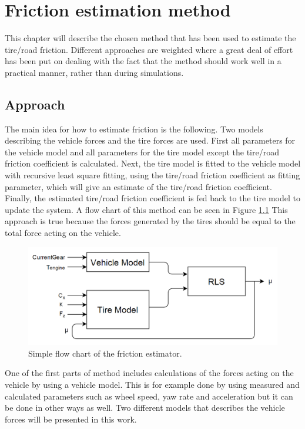 \chapter{Friction estimation method}

This chapter will describe the chosen method that has been used to estimate the tire/road friction. Different approaches are weighted where a great deal of effort has been put on dealing with the fact that the method should work well in a practical manner, rather than during simulations.

\section{Approach}
The main idea for how to estimate friction is the following. Two models describing the vehicle forces and the tire forces are used. First all parameters for the vehicle model and all parameters for the tire model except the tire/road friction coefficient is calculated. Next, the tire model is fitted to the vehicle model with recursive least square fitting, using the tire/road friction coefficient as fitting parameter, which will give an estimate of the tire/road friction coefficient. Finally, the estimated tire/road friction coefficient is fed back to the tire model to update the system. A flow chart of this method can be seen in Figure \ref{friction_estimator} This approach is true because the forces generated by the tires should be equal to the total force acting on the vehicle.

\begin{figure}[h]
	\centering
	\includegraphics[width=1.0\textwidth]{Pictures/friction_estimator}
	\caption {Simple flow chart of the friction estimator.}
	\label{friction_estimator}
\end{figure}

One of the first parts of method includes calculations of the forces acting on the vehicle by using a vehicle model. This is for example done by using measured and calculated parameters such as wheel speed, yaw rate and acceleration but it can be done in other ways as well. Two different models that describes the vehicle forces will be presented in this work. 

